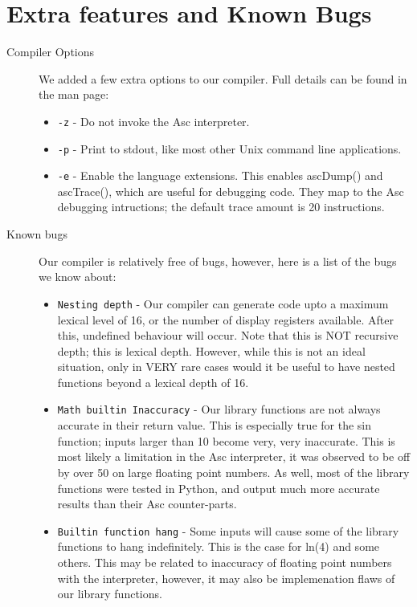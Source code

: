 \documentclass{article}
\begin{document}
\section*{Extra features and Known Bugs}
\begin{description}

\item[Compiler Options]
	We added a few extra options to our compiler. Full details can be found in the man page:
	\begin{itemize}
		\item \texttt{-z} - Do not invoke the Asc interpreter.
		\item \texttt{-p} - Print to stdout, like most other Unix command line applications.
		\item \texttt{-e} - Enable the language extensions. This enables ascDump() and ascTrace(),
			which are useful for debugging code. They map to the Asc debugging intructions; the 
			default trace amount is 20 instructions.
	\end{itemize}

\item[Known bugs]
	Our compiler is relatively free of bugs, however, here is a list of the bugs we know about:
	\begin{itemize}
		\item \texttt{Nesting depth} - Our compiler can generate code upto a maximum lexical level of 16, or the number of display registers available.
			After this, undefined behaviour will occur. Note that this is NOT recursive depth; this is lexical depth. However, while this is not an ideal
			situation, only in VERY rare cases would it be useful to have nested functions beyond a lexical depth of 16.
		
		\item \texttt{Math builtin Inaccuracy} - Our library functions are not always accurate in their return value. This is especially true for the sin function; inputs larger
			than 10 become very, very inaccurate. This is most likely a limitation in the Asc interpreter, it was observed to be off by over 50 on large floating point numbers.
			As well, most of the library functions were tested in Python, and output much more accurate results than their Asc counter-parts.
		
		\item \texttt{Builtin function hang} - Some inputs will cause some of the library functions to hang indefinitely. This is the case for ln(4) and some others. This may be
			related to inaccuracy of floating point numbers with the interpreter, however, it may also be implemenation flaws of our library functions.
	\end{itemize}
\end{description}
\end{document}
